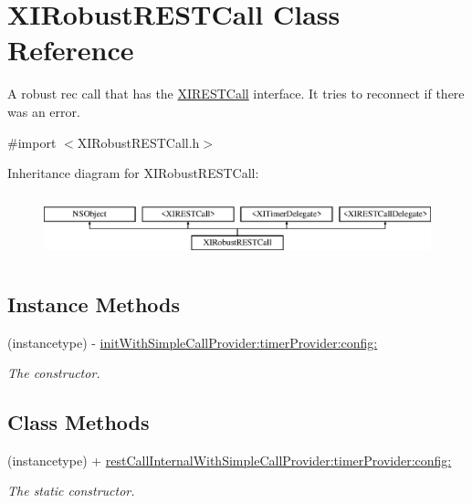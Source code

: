 \hypertarget{interface_x_i_robust_r_e_s_t_call}{}\section{X\+I\+Robust\+R\+E\+S\+T\+Call Class Reference}
\label{interface_x_i_robust_r_e_s_t_call}


A robust rec call that has the \hyperlink{class_x_i_r_e_s_t_call-p}{X\+I\+R\+E\+S\+T\+Call} interface. It tries to reconnect if there was an error.  




{\ttfamily \#import $<$X\+I\+Robust\+R\+E\+S\+T\+Call.\+h$>$}

Inheritance diagram for X\+I\+Robust\+R\+E\+S\+T\+Call\+:\begin{figure}[H]
\begin{center}
\leavevmode
\includegraphics[height=1.879195cm]{interface_x_i_robust_r_e_s_t_call}
\end{center}
\end{figure}
\subsection*{Instance Methods}
\begin{DoxyCompactItemize}
\item 
(instancetype) -\/ \hyperlink{interface_x_i_robust_r_e_s_t_call_af138b45a25978ef766bd3fe602cbffec}{init\+With\+Simple\+Call\+Provider\+:timer\+Provider\+:config\+:}
\begin{DoxyCompactList}\small\item\em The constructor. \end{DoxyCompactList}\end{DoxyCompactItemize}
\subsection*{Class Methods}
\begin{DoxyCompactItemize}
\item 
(instancetype) + \hyperlink{interface_x_i_robust_r_e_s_t_call_a1ef8d367191235dd2e223d281cf6570b}{rest\+Call\+Internal\+With\+Simple\+Call\+Provider\+:timer\+Provider\+:config\+:}
\begin{DoxyCompactList}\small\item\em The static constructor. \end{DoxyCompactList}\end{DoxyCompactItemize}
